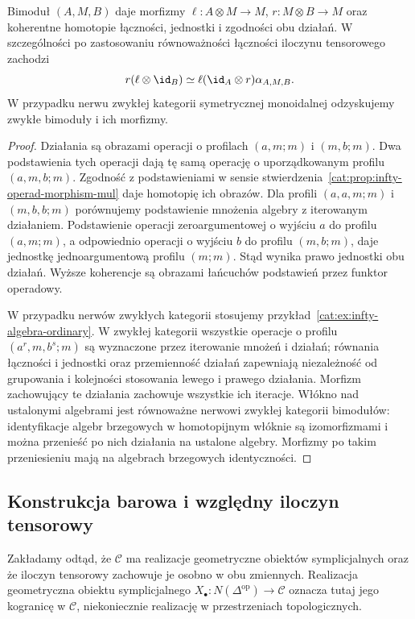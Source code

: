 \begin{stwierdzenie}\label{cat:prop:infty-bimodule-actions}
Bimoduł $(A,M,B)$ daje morfizmy $\ell:A\otimes M\to M$, $r:M\otimes B\to M$ oraz koherentne homotopie łączności, jednostki i zgodności obu działań. W szczególności po zastosowaniu równoważności łączności iloczynu tensorowego zachodzi
\[
 r(\ell\otimes\id_B)\simeq
 \ell(\id_A\otimes r)\alpha_{A,M,B}.
\]
W przypadku nerwu zwykłej kategorii symetrycznej monoidalnej odzyskujemy zwykłe bimoduły i ich morfizmy.
\end{stwierdzenie}
\begin{proof}
Działania są obrazami operacji o profilach $(a,m;m)$ i $(m,b;m)$. Dwa podstawienia tych operacji dają tę samą operację o uporządkowanym profilu $(a,m,b;m)$. Zgodność z podstawieniami w sensie stwierdzenia~\ref{cat:prop:infty-operad-morphism-mul} daje homotopię ich obrazów. Dla profili $(a,a,m;m)$ i $(m,b,b;m)$ porównujemy podstawienie mnożenia algebry z iterowanym działaniem. Podstawienie operacji zeroargumentowej o wyjściu $a$ do profilu $(a,m;m)$, a odpowiednio operacji o wyjściu $b$ do profilu $(m,b;m)$, daje jednostkę jednoargumentową profilu $(m;m)$. Stąd wynika prawo jednostki obu działań. Wyższe koherencje są obrazami łańcuchów podstawień przez funktor operadowy.

W przypadku nerwów zwykłych kategorii stosujemy przykład~\ref{cat:ex:infty-algebra-ordinary}. W zwykłej kategorii wszystkie operacje o profilu $(a^r,m,b^s;m)$ są wyznaczone przez iterowanie mnożeń i działań; równania łączności i jednostki oraz przemienność działań zapewniają niezależność od grupowania i kolejności stosowania lewego i prawego działania. Morfizm zachowujący te działania zachowuje wszystkie ich iteracje. Włókno nad ustalonymi algebrami jest równoważne nerwowi zwykłej kategorii bimodułów: identyfikacje algebr brzegowych w homotopijnym włóknie są izomorfizmami i można przenieść po nich działania na ustalone algebry. Morfizmy po takim przeniesieniu mają na algebrach brzegowych identyczności.
\end{proof}

\subsection{Konstrukcja barowa i względny iloczyn tensorowy}

Zakładamy odtąd, że $\mathcal C$ ma realizacje geometryczne obiektów symplicjalnych oraz że iloczyn tensorowy zachowuje je osobno w obu zmiennych. Realizacja geometryczna obiektu symplicjalnego $X_\bullet:N(\Delta^{\mathrm{op}})\to\mathcal C$ oznacza tutaj jego kogranicę w $\mathcal C$, niekoniecznie realizację w przestrzeniach topologicznych.

